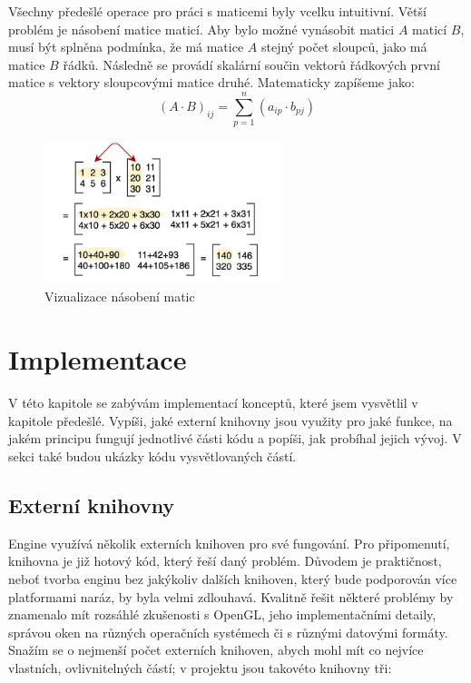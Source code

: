 \documentclass[12pt]{article}
\begin{document}
Všechny předešlé operace pro práci s maticemi byly vcelku intuitivní. Větší problém je násobení matice maticí. Aby bylo možné vynásobit matici $A$ maticí $B$, musí být splněna podmínka, že má matice $A$ stejný počet sloupců, jako má matice $B$ řádků. Následně se provádí skalární součin vektorů řádkových první matice s vektory sloupcovými matice druhé. Matematicky zapíšeme jako:
\begin{equation}
    (A \cdot B)_{ij} = \sum_{p=1}^{n}(a_{ip} \cdot {b_{pj}})
\end{equation}
\begin{figure}[h]
    \centering
    \includegraphics[height=4.2cm]{images/matrix_mp.png}
    \caption[Vizualizace násobení matic]{Vizualizace násobení matic \cite{matrix_mp_img}}
    \label{fig:Vizualizace násobení matic}
\end{figure}
\section{Implementace}

V této kapitole se zabývám implementací konceptů, které jsem vysvětlil v kapitole předešlé. Vypíši, jaké externí knihovny jsou využity pro jaké funkce, na jakém principu fungují jednotlivé části kódu a popíši, jak probíhal jejich vývoj. V sekci také budou ukázky kódu vysvětlovaných částí.
\subsection{Externí knihovny}

Engine využívá několik externích knihoven pro své fungování. Pro připomenutí, knihovna je již hotový kód, který řeší daný problém. Důvodem je praktičnost, neboť tvorba enginu bez jakýkoliv dalších knihoven, který bude podporován více platformami naráz, by byla velmi zdlouhavá. Kvalitně řešit některé problémy by znamenalo mít rozsáhlé zkušenosti s OpenGL, jeho implementačními detaily, správou oken na různých operačních systémech či s různými datovými formáty. Snažím se o nejmenší počet externích knihoven, abych mohl mít co nejvíce vlastních, ovlivnitelných částí; v projektu jsou takovéto knihovny tři:
\end{document}
